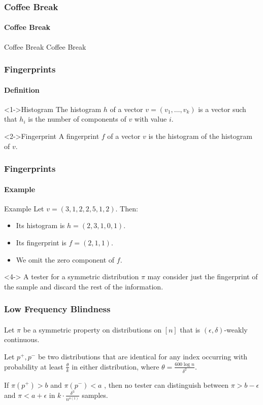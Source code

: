 \documentclass{beamer}
\begin{document}
\begin{frame}
  \frametitle{Coffee Break}
  \framesubtitle{Coffee Break}
  \begin{block}{Coffee Break}
    Coffee Break
  \end{block}
\end{frame}
\begin{frame}
  \frametitle{Fingerprints} \framesubtitle{Definition}

  \begin{block}<1->{Histogram}
    The histogram $h$ of a vector $v=(v_1,\ldots,v_k)$ is a vector such
    that $h_i$ is the number of components of $v$ with value $i$.
  \end{block}
  \begin{block}<2->{Fingerprint}
    A fingerprint $f$ of a vector $v$ is the histogram of the
    histogram of $v$.
  \end{block}
\end{frame}

\begin{frame}
  \frametitle{Fingerprints} \framesubtitle{Example}

  \begin{block}{Example}
    Let $v=(3,1,2,2,5,1,2)$. Then:
    \begin{itemize}
    \item<1-> Its histogram is $h=(2,3,1,0,1)$.
    \item<2-> Its fingerprint is $f=(2,1,1)$.
    \item<3-> We omit the zero component of $f$.
    \end{itemize}
  \end{block}
  \begin{block}<4->{} A tester for a symmetric distribution $\pi$ may
    consider just the fingerprint of the sample and discard the rest
    of the information.
  \end{block}
\end{frame}


\begin{frame}
  \frametitle{Low Frequency Blindness} \framesubtitle{}
  \begin{theorem}
    Let $\pi$ be a symmetric property on distributions on $[n]$ that
    is $(\epsilon,\delta)$-weakly continuous.

    Let $p^+,p^-$ be two distributions that are identical for any
    index occurring with probability at least $\frac{\theta}{k}$ in
    either distribution, where $\theta=\frac{600\log n}{\delta^2}$.

    If $\pi(p^+)>b$ and $\pi(p^-)<a$ , then no tester can distinguish
    between $\pi>b-\epsilon$ and $\pi<a+\epsilon$ in $k\cdot
    \frac{\delta^3}{n^{o(1)}}$ samples.
  \end{theorem}
\end{frame}
\end{document}
